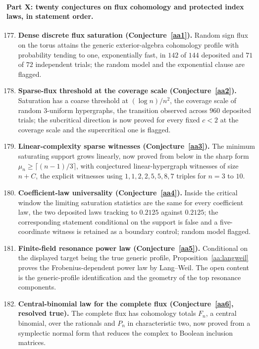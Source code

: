 \documentclass[11pt]{article}
\theoremstyle{definition}
\begin{document}
\paragraph{Part X: twenty conjectures on flux cohomology and protected index laws, in statement order.}
\begin{enumerate}\setcounter{enumi}{176}
\item \textbf{Dense discrete flux saturation (Conjecture~\ref{aa1}).}  Random sign flux on the torus attains the generic exterior-algebra cohomology profile with probability tending to one, exponentially fast, in $142$ of $144$ deposited and $71$ of $72$ independent trials; the random model and the exponential clause are flagged.
\item \textbf{Sparse-flux threshold at the coverage scale (Conjecture~\ref{aa2}).}  Saturation has a coarse threshold at $(\log n)/n^2$, the coverage scale of random $3$-uniform hypergraphs, the transition observed across $960$ deposited trials; the subcritical direction is now proved for every fixed $c<2$ at the coverage scale and the supercritical one is flagged.
\item \textbf{Linear-complexity sparse witnesses (Conjecture~\ref{aa3}).}  The minimum saturating support grows linearly, now proved from below in the sharp form $\mu_n\ge\lceil(n-1)/3\rceil$, with conjectured linear-hypergraph witnesses of size $n+C$, the explicit witnesses using $1,1,2,2,5,5,8,7$ triples for $n=3$ to $10$.
\item \textbf{Coefficient-law universality (Conjecture~\ref{aa4}).}  Inside the critical window the limiting saturation statistics are the same for every coefficient law, the two deposited laws tracking to $0.2125$ against $0.2125$; the corresponding statement conditional on the support is false and a five-coordinate witness is retained as a boundary control; random model flagged.
\item \textbf{Finite-field resonance power law (Conjecture~\ref{aa5}).}  Conditional on the displayed target being the true generic profile, Proposition~\ref{aa:langweil} proves the Frobenius-dependent power law by Lang--Weil.  The open content is the generic-profile identification and the geometry of the top resonance components.
\item \textbf{Central-binomial law for the complete flux (Conjecture~\ref{aa6}, resolved true).} The complete flux has cohomology totals $F_n$, a central binomial, over the rationals and $P_n$ in characteristic two, now proved from a symplectic normal form that reduces the complex to Boolean inclusion matrices.

\end{enumerate}
\end{document}

